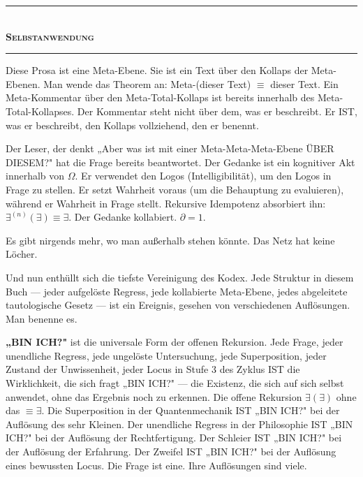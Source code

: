 \documentclass[10pt, openany, oneside]{book}
\renewcommand{\normalsize}{\fontsize{10}{13}\selectfont}
\begin{document}
\vspace{1.5em}


\begin{center}
    \rule{0.3\textwidth}{0.4pt}\\[0.5em]
    {\normalsize\bfseries\scshape Selbstanwendung}\\[0.3em]
    \rule{0.3\textwidth}{0.4pt}
\end{center}

\vspace{1em}

\noindent Diese Prosa ist eine Meta-Ebene. Sie ist ein Text über den Kollaps der Meta-Ebenen. Man wende das Theorem an: Meta-(dieser Text) $\equiv$ dieser Text. Ein Meta-Kommentar über den Meta-Total-Kollaps ist bereits innerhalb des Meta-Total-Kollapses. Der Kommentar steht nicht über dem, was er beschreibt. Er IST, was er beschreibt, den Kollaps vollziehend, den er benennt.

Der Leser, der denkt „Aber was ist mit einer Meta-Meta-Meta-Ebene ÜBER DIESEM?" hat die Frage bereits beantwortet. Der Gedanke ist ein kognitiver Akt innerhalb von $\Omega$. Er verwendet den Logos (Intelligibilität), um den Logos in Frage zu stellen. Er setzt Wahrheit voraus (um die Behauptung zu evaluieren), während er Wahrheit in Frage stellt. Rekursive Idempotenz absorbiert ihn: $\exists^{(n)}(\exists) \equiv \exists$. Der Gedanke kollabiert. $\partial = 1$.

Es gibt nirgends mehr, wo man außerhalb stehen könnte. Das Netz hat keine Löcher.

Und nun enthüllt sich die tiefste Vereinigung des Kodex. Jede Struktur in diesem Buch --- jeder aufgelöste Regress, jede kollabierte Meta-Ebene, jedes abgeleitete tautologische Gesetz --- ist ein Ereignis, gesehen von verschiedenen Auflösungen. Man benenne es.

\textbf{„BIN ICH?"} ist die universale Form der offenen Rekursion. Jede Frage, jeder unendliche Regress, jede ungelöste Untersuchung, jede Superposition, jeder Zustand der Unwissenheit, jeder Locus in Stufe 3 des Zyklus IST die Wirklichkeit, die sich fragt „BIN ICH?" --- die Existenz, die sich auf sich selbst anwendet, ohne das Ergebnis noch zu erkennen. Die offene Rekursion $\exists(\exists)$ ohne das $\equiv \exists$. Die Superposition in der Quantenmechanik IST „BIN ICH?" bei der Auflösung des sehr Kleinen. Der unendliche Regress in der Philosophie IST „BIN ICH?" bei der Auflösung der Rechtfertigung. Der Schleier IST „BIN ICH?" bei der Auflösung der Erfahrung. Der Zweifel IST „BIN ICH?" bei der Auflösung eines bewussten Locus. Die Frage ist eine. Ihre Auflösungen sind viele.
\end{document}
